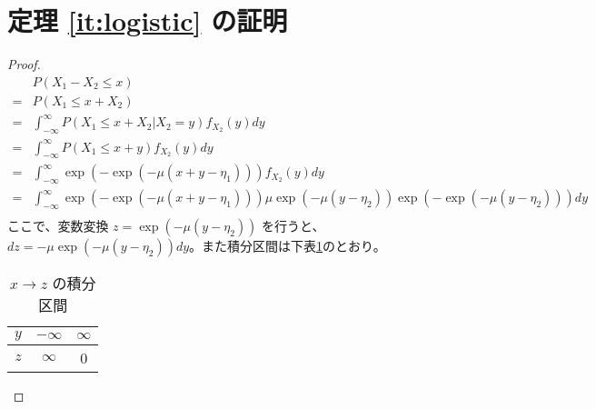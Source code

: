 \section{定理 \ref{it:logistic} の証明}
\begin{proof}
    \label{prf:logistic}
    \begin{equation}
        \begin{aligned}
              & P(X_1-X_2 \le x)                                                                                              \\
            = & P(X_1 \le x+X_2)                                                                                              \\
            = & \int_{-\infty}^{\infty} P(X_1 \le x+X_2|X_2=y)f_{X_2}(y)dy                                                    \\
            = & \int_{-\infty}^{\infty} P(X_1 \le x+y)f_{X_2}(y)dy                                                            \\
            = & \int_{-\infty}^{\infty} \exp(-\exp(-\mu(x+y-\eta_1)))f_{X_2}(y)dy                                             \\
            = & \int_{-\infty}^{\infty} \exp(-\exp(-\mu(x+y-\eta_1)))\mu \exp(-\mu (y-\eta_2)) \exp(-\exp(-\mu (y-\eta_2)))dy \\
        \end{aligned}
    \end{equation}
    ここで、変数変換 $z = \exp(-\mu (y-\eta_2))$ を行うと、$dz = -\mu\exp(-\mu (y-\eta_2))dy$。また積分区間は下表\ref{tbl:int_interval}のとおり。
    
    \begin{table}[ht]
        \caption{$x \to z$ の積分区間}
        \centering
        \label{tbl:int_interval}
        \begin{tabular}{ccc}
            \hline
            $y$ & $-\infty$ & $\infty$ \\
            \hline
            $z$ & $\infty$  & 0        \\
            \hline
        \end{tabular}
    \end{table}
    

\end{proof}
